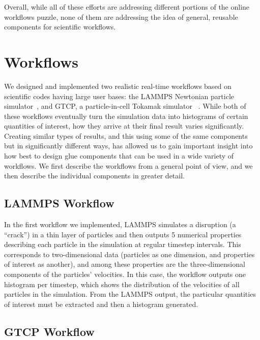 \documentclass[conference]{IEEEtran}
\begin{document}
Overall, while all of these efforts are addressing different portions of the
online workflows puzzle, none of them are addressing the idea of general,
reusable components for scientific workflows.

\section{Workflows}
\label{s:workflow}

We designed and implemented two realistic real-time workflows based on
scientific codes having large user bases: the LAMMPS Newtonian particle
simulator~\cite{plimpton:1997:lammps}, and GTCP, a particle-in-cell
Tokamak simulator ~\cite{lin:gtc}. While both of these
workflows eventually turn the simulation data into histograms of certain
quantities of interest, how they arrive at their final result varies
significantly. Creating similar types of results, and this using some of the
same components but in significantly different ways, has allowed us to gain
important insight into how best to design glue components that can be used in a wide
variety of workflows. We first describe the workflows from a general point of
view, and we then describe the individual components in greater detail.

\subsection{LAMMPS Workflow}

In the first workflow we implemented, LAMMPS simulates a disruption (a ``crack'')
in a thin layer of particles and then outputs 5 numerical properties describing
each particle in the simulation at regular timestep intervals. This
corresponds to two-dimensional data (particles as one dimension, and properties
of interest as another), and among these properties are the
three-dimensional components of the particles' velocities. In this case, the
workflow outputs one histogram per timestep, which shows the distribution of the
velocities of all particles in the simulation.  From the LAMMPS output, the particular
quantities of interest must be extracted and then a histogram generated.

\subsection{GTCP Workflow}
\end{document}
